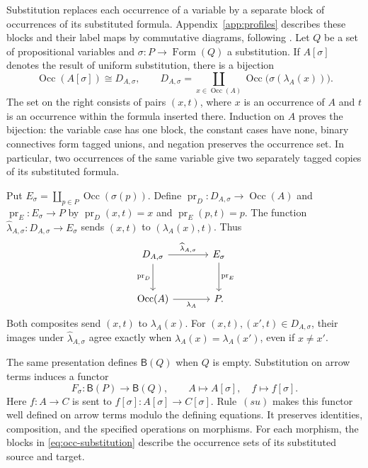 \documentclass[11pt]{article}
\newcommand{\B}{\mathsf B}
\newcommand{\Occ}{\operatorname{Occ}}
\newcommand{\FormulaSet}{\operatorname{Form}}
\begin{document}
Substitution replaces each occurrence of a variable by a separate
block of occurrences of its substituted formula.
Appendix~\ref{app:profiles} describes these blocks and their label maps
by commutative diagrams, following \cite[\S9]{Notation}.
Let $Q$ be a set of propositional variables and
$\sigma:P\to\FormulaSet(Q)$ a substitution. If $A[\sigma]$ denotes the
result of uniform substitution, there is a bijection
\begin{equation}
 \Occ(A[\sigma])\cong D_{A,\sigma},\qquad
 D_{A,\sigma}=\coprod_{x\in\Occ(A)}
                  \Occ\bigl(\sigma(\lambda_A(x))\bigr).
 \label{eq:occ-substitution}
\end{equation}
The set on the right consists of pairs $(x,t)$, where $x$ is an
occurrence of $A$ and $t$ is an occurrence within the formula inserted there.
Induction on $A$ proves the bijection: the variable case has one
block, the constant cases have none, binary connectives form tagged
unions, and negation preserves the occurrence set. In particular,
two occurrences of the same variable give two separately tagged
copies of its substituted formula.

Put $E_\sigma=\coprod_{p\in P}\Occ(\sigma(p))$.
Define $\operatorname{pr}_D:D_{A,\sigma}\to\Occ(A)$ and
$\operatorname{pr}_E:E_\sigma\to P$ by
$\operatorname{pr}_D(x,t)=x$ and $\operatorname{pr}_E(p,t)=p$.
The function
$\widehat\lambda_{A,\sigma}:D_{A,\sigma}\to E_\sigma$ sends
$(x,t)$ to $(\lambda_A(x),t)$. Thus
\begin{equation}
\begin{tikzcd}[column sep=large,row sep=large]
 D_{A,\sigma}\arrow[r,"\widehat\lambda_{A,\sigma}"]
   \arrow[d,"\operatorname{pr}_D"']
   &E_\sigma\arrow[d,"\operatorname{pr}_E"]\\
 \Occ(A)\arrow[r,"\lambda_A"']&P.
\end{tikzcd}
\label{eq:block-square}
\end{equation}
Both composites send $(x,t)$ to $\lambda_A(x)$.
For $(x,t),(x',t)\in D_{A,\sigma}$, their images under
$\widehat\lambda_{A,\sigma}$ agree exactly when
$\lambda_A(x)=\lambda_A(x')$, even if $x\ne x'$.

The same presentation defines $\B(Q)$ when $Q$ is empty.
Substitution on arrow terms induces a functor
\[
 F_\sigma:\B(P)\longrightarrow\B(Q),\qquad
 A\longmapsto A[\sigma],\quad f\longmapsto f[\sigma].
\]
Here $f:A\to C$ is sent to
$f[\sigma]:A[\sigma]\to C[\sigma]$.
Rule~$(su)$ makes this functor well defined on arrow terms modulo the
defining equations. It preserves identities, composition, and the
specified operations on morphisms. For each morphism, the blocks in
\eqref{eq:occ-substitution} describe the occurrence sets of its
substituted source and target.
\end{document}
